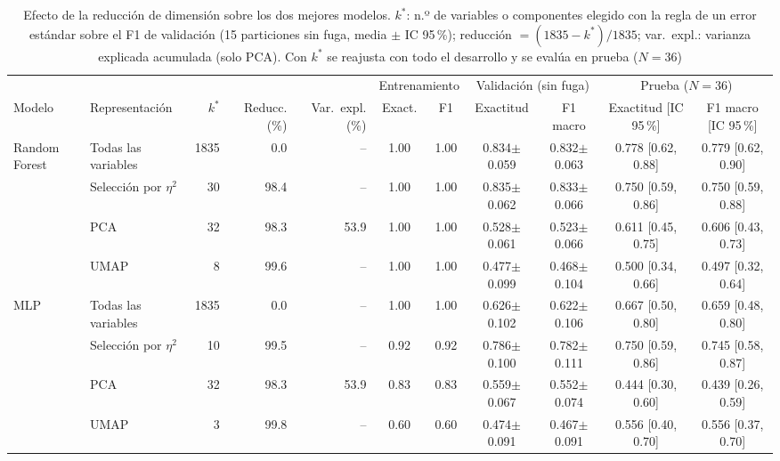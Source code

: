 \begin{table}[!t]
\caption{Efecto de la reducción de dimensión sobre los dos mejores modelos. $k^*$: n.º de variables o componentes elegido con la regla de un error estándar sobre el F1 de validación (15 particiones sin fuga, media $\pm$ IC 95\,\%); reducción $=(1835-k^*)/1835$; var.~expl.: varianza explicada acumulada (solo PCA). Con $k^*$ se reajusta con todo el desarrollo y se evalúa en prueba ($N=36$)}
\label{tab:red}
\centering\footnotesize
\setlength{\tabcolsep}{2.8pt}\renewcommand{\arraystretch}{1.08}
\begin{tabular}{@{}l l r r r c c c c c c@{}}
\toprule
 & & & & & \multicolumn{2}{c}{Entrenamiento} & \multicolumn{2}{c}{Validación (sin fuga)} & \multicolumn{2}{c}{Prueba ($N=36$)}\\
\cmidrule(lr){6-7}\cmidrule(lr){8-9}\cmidrule(l){10-11}
Modelo & Representación & $k^*$ & Reducc. (\%) & Var.~expl. (\%) & Exact. & F1 & Exactitud & F1 macro & Exactitud [IC 95\,\%] & F1 macro [IC 95\,\%]\\
\midrule
Random Forest & Todas las variables & 1835 & 0.0 & -- & 1.00 & 1.00 & 0.834$\pm$0.059 & 0.832$\pm$0.063 & 0.778 [0.62, 0.88] & 0.779 [0.62, 0.90] \\
 & Selección por $\eta^2$ & 30 & 98.4 & -- & 1.00 & 1.00 & 0.835$\pm$0.062 & 0.833$\pm$0.066 & 0.750 [0.59, 0.86] & 0.750 [0.59, 0.88] \\
 & PCA & 32 & 98.3 & 53.9 & 1.00 & 1.00 & 0.528$\pm$0.061 & 0.523$\pm$0.066 & 0.611 [0.45, 0.75] & 0.606 [0.43, 0.73] \\
 & UMAP & 8 & 99.6 & -- & 1.00 & 1.00 & 0.477$\pm$0.099 & 0.468$\pm$0.104 & 0.500 [0.34, 0.66] & 0.497 [0.32, 0.64] \\
\midrule
MLP & Todas las variables & 1835 & 0.0 & -- & 1.00 & 1.00 & 0.626$\pm$0.102 & 0.622$\pm$0.106 & 0.667 [0.50, 0.80] & 0.659 [0.48, 0.80] \\
 & Selección por $\eta^2$ & 10 & 99.5 & -- & 0.92 & 0.92 & 0.786$\pm$0.100 & 0.782$\pm$0.111 & 0.750 [0.59, 0.86] & 0.745 [0.58, 0.87] \\
 & PCA & 32 & 98.3 & 53.9 & 0.83 & 0.83 & 0.559$\pm$0.067 & 0.552$\pm$0.074 & 0.444 [0.30, 0.60] & 0.439 [0.26, 0.59] \\
 & UMAP & 3 & 99.8 & -- & 0.60 & 0.60 & 0.474$\pm$0.091 & 0.467$\pm$0.091 & 0.556 [0.40, 0.70] & 0.556 [0.37, 0.70] \\
\bottomrule
\end{tabular}
\end{table}
